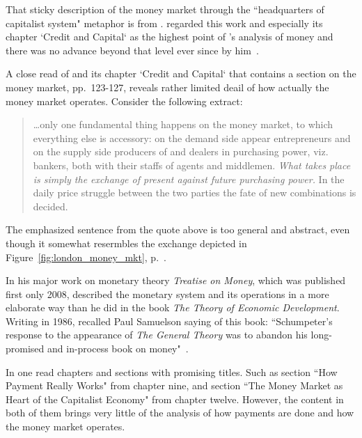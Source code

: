That sticky description of the money market through the ``headquarters of capitalist system" metaphor is from \cite{schumpeter1934}. \citeauthor{minsky1986_} regarded this work and especially its chapter `Credit and Capital` as the highest point of \citeauthor{schumpeter1934}'s analysis of money and there was no advance beyond that level ever since by him~\citep[p.~112]{minsky1986_}.

A close read of \citep{schumpeter1934} and its chapter `Credit and Capital` that contains a section on the money market, pp.~123-127, reveals rather limited deail of how actually the money market operates. Consider the following extract:

\begin{quote}
\dots only one fundamental thing happens on the money market, to which everything else is accessory: on the demand side appear entrepreneurs and on the supply side producers of and dealers in purchasing power, viz. bankers, both with their staffs of agents and middlemen. \textit{What takes place is simply the exchange of present against future purchasing power.} In the daily price struggle between the two parties the fate of new combinations is decided.~\citep[p.~125, emphasis added]{schumpeter1934}
\end{quote}

The emphasized sentence from the quote above is too general and abstract, even though it somewhat resermbles the exchange depicted in Figure~\ref{fig:london_money_mkt}, p.~\pageref{fig:london_money_mkt}. 

In his major work on monetary theory \textit{Treatise on Money}, which was published first only 2008, \cite{schumpeter2014} described the monetary system and its operations in a more elaborate way than he did in the \citeyear{schumpeter1934} book \textit{The Theory of Economic Development}. Writing in 1986, \citeauthor{minsky1986_} recalled Paul Samuelson saying of this book: ``Schumpeter's response to the appearance of \textit{The General Theory} was to abandon his long-promised and in-process book on money"~\citep[p.~112]{minsky1986_}.

In \citep{schumpeter2014} one read chapters and sections with promising titles. Such as section ``How Payment Really Works" from chapter nine, and section ``The Money Market as Heart of the Capitalist Economy" from chapter twelve. However, the content in both of them brings very little of the analysis of how payments are done and how the money market operates.

